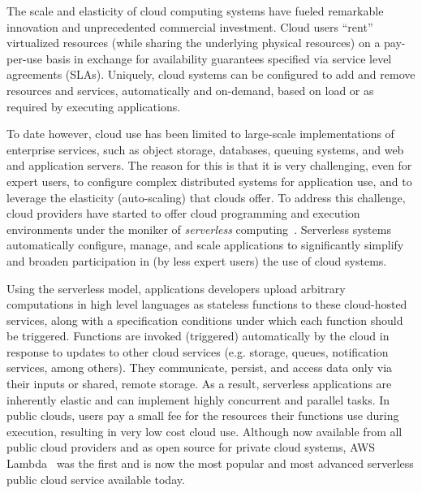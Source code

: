 The scale and elasticity of cloud computing systems have 
fueled remarkable innovation and unprecedented commercial 
investment.  Cloud users ``rent'' virtualized resources (while sharing
the underlying physical resources) on a pay-per-use basis
in exchange for availability guarantees specified via service level
agreements (SLAs). Uniquely, cloud systems can be configured 
to add and remove resources and services,
automatically and on-demand, based on load 
or as required by executing applications.

To date however, cloud use has been limited to large-scale 
implementations of enterprise services, such as
object storage, databases, queuing systems, and web and application servers.
The reason for this is that it is very
challenging, even for expert users, to configure complex
distributed systems for application use, 
and to leverage the elasticity (auto-scaling) that
clouds offer. To address this challenge, cloud providers 
have started to offer cloud programming and execution environments
under the moniker of \textit{serverless} 
computing~\cite{ref:jonas2017occupy, ref:onesteptwostep, ref:peeking}.  Serverless
systems automatically configure, manage, and scale applications
to significantly simplify and broaden participation in (by less expert
users) the use of cloud systems.

Using the serverless model, applications developers upload 
arbitrary computations in high level languages
as stateless functions to these cloud-hosted services, along with a
specification conditions under which each
function should be triggered.  Functions are invoked (triggered)
automatically by the cloud in response to updates to other cloud services
(e.g. storage, queues, notification services, among others). They
communicate, persist, and access data only 
via their inputs or shared, remote storage.  
As a result, serverless applications are inherently elastic and can 
implement highly concurrent and parallel tasks.
In public clouds, users pay a small fee for the resources their 
functions use during execution, resulting in very low cost cloud use.
Although now available from all public cloud providers and as open 
source for private cloud systems, 
AWS Lambda~\cite{ref:awslambdadg} was the first and is now the 
most popular and most advanced serverless public cloud service 
available today.

